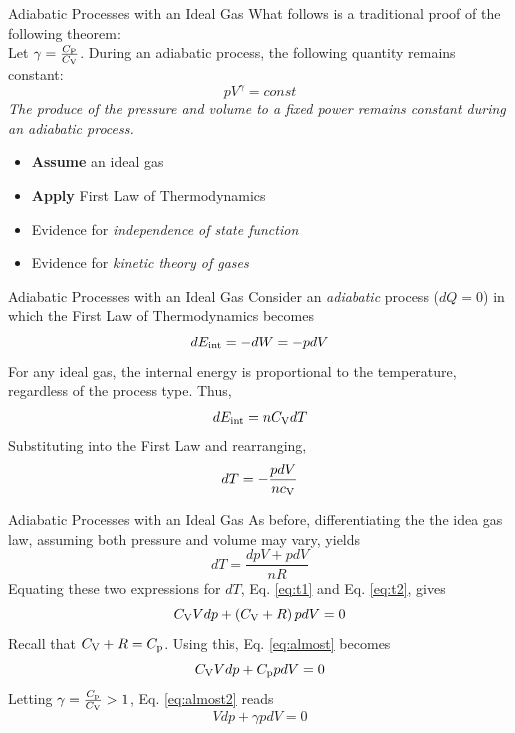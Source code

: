 \documentclass{beamer}
\begin{document}
\begin{frame}{Adiabatic Processes with an Ideal Gas}
\small What follows is a traditional proof of the following theorem: \\ \vspace{0.5cm}
Let $\gamma = \frac{C_{\rm P}}{C_{\rm V}}$.  During an adiabatic process, the following quantity remains constant:
\begin{equation}
pV^{\gamma} = const
\end{equation}
\textit{The produce of the pressure and volume to a fixed power remains constant during an adiabatic process.} \\ \vspace{0.5cm}
\begin{itemize}
\item \textbf{Assume} an ideal gas
\item \textbf{Apply} First Law of Thermodynamics
\item Evidence for \textit{independence of state function}
\item Evidence for \textit{kinetic theory of gases}
\end{itemize}
\end{frame}

\begin{frame}{Adiabatic Processes with an Ideal Gas}
Consider an \textit{adiabatic} process ($dQ=0$) in which the First Law of Thermodynamics becomes
\begin{equation}
dE_{\rm int} = -dW = -pdV
\end{equation}
For any ideal gas, the internal energy is proportional to the temperature, regardless of the process type.  Thus,
\begin{equation}
dE_{\rm int} = n C_{\rm V} dT
\end{equation}
Substituting into the First Law and rearranging,
\begin{equation}
dT = -\frac{pdV}{n c_{\rm V}} \label{eq:t1}
\end{equation}
\end{frame}

\begin{frame}{Adiabatic Processes with an Ideal Gas}
\small
As before, differentiating the the idea gas law, assuming both pressure and volume may vary, yields
\begin{equation}
dT = \frac{dp V+pdV}{nR} \label{eq:t2}
\end{equation}
Equating these two expressions for $dT$, Eq. \ref{eq:t1} and Eq. \ref{eq:t2}, gives 
\begin{equation}
C_{\rm V} V dp + \left( C_{\rm V} + R \right) p dV = 0 \label{eq:almost}
\end{equation}
Recall that $C_{\rm V} + R = C_{\rm p}$.  Using this, Eq. \ref{eq:almost} becomes
\begin{equation}
C_{\rm V} V dp + C_{\rm p} p dV = 0 \label{eq:almost2}
\end{equation}
Letting $\gamma = \frac{C_{\rm p}}{C_{\rm V}} > 1$, Eq. \ref{eq:almost2} reads
\begin{equation}
V dp + \gamma p dV = 0 \label{eq:gamma}
\end{equation}
\end{frame}
\end{document}
